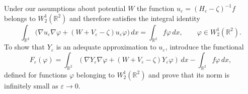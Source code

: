 \documentclass[reqno]{amsart}
\theoremstyle{plain}
\numberwithin{equation}{section}
\newcommand{\Real}{\mathbb R}
\newcommand{\eps}{\varepsilon}
\renewcommand{\phi}{\varphi}
\begin{document}
Under our assumptions about potential $W$ the function $u_\eps=(H_\eps-\zeta)^{-1}f$ belongs to $W_2^1(\Real^2)$ and therefore satisfies the integral identity
\begin{equation}\label{IntegralIdentityUe}
  \int_{\Real^2}\big(\nabla u_\eps \nabla \phi+
              (W+V_\eps-\zeta)u_\eps \phi\big)\,dx= \int_{\Real^2}f\phi\,dx, \qquad \phi\in W_2^1(\Real^2).
\end{equation}
To show  that $Y_\eps$ is an adequate approximation to $u_\eps$, introduce  the functional
\begin{equation}\label{Feps}
F_\eps(\phi)=\int_{\Real^2}\left(\nabla Y_\eps \nabla \phi+
              (W+V_\eps-\zeta)Y_\eps \phi\right)\,dx
            -   \int_{\Real^2}f\phi\,dx,
\end{equation}
defined for functions $\phi$ belonging to $W_2^1(\Real^2)$ and prove that its norm is  infinitely small as $\eps\to 0$.
\end{document}
